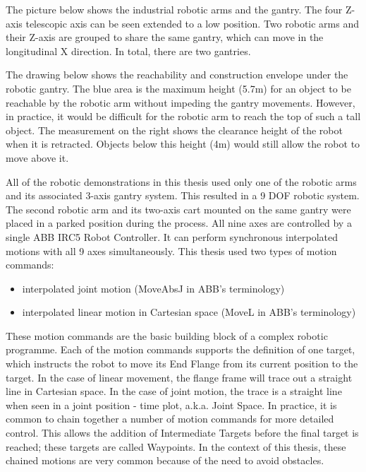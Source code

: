 The picture below shows the industrial robotic arms and the gantry. The four Z-axis telescopic axis can be seen extended to a low position. Two robotic arms and their Z-axis are grouped to share the same gantry, which can move in the longitudinal X direction. In total, there are two gantries.

The drawing below shows the reachability and construction envelope under the robotic gantry. The blue area is the maximum height (5.7m) for an object to be reachable by the robotic arm without impeding the gantry movements. However, in practice, it would be difficult for the robotic arm to reach the top of such a tall object. The measurement on the right shows the clearance height of the robot when it is retracted. Objects below this height (4m) would still allow the robot to move above it. 

All of the robotic demonstrations in this thesis used only one of the robotic arms and its associated 3-axis gantry system. This resulted in a 9 DOF robotic system. The second robotic arm and its two-axis cart mounted on the same gantry were placed in a parked position during the process.
All nine axes are controlled by a single ABB IRC5 Robot Controller. It can perform synchronous interpolated motions with all 9 axes simultaneously. This thesis used two types of motion commands: 

\begin{itemize}
    \item interpolated joint motion (MoveAbsJ in ABB’s terminology)
    \item interpolated linear motion in Cartesian space (MoveL in ABB’s terminology)
\end{itemize}

These motion commands are the basic building block of a complex robotic programme. Each of the motion commands supports the definition of one target, which instructs the robot to move its End Flange from its current position to the target. In the case of linear movement, the flange frame will trace out a straight line in Cartesian space. In the case of joint motion, the trace is a straight line when seen in a joint position - time plot, a.k.a. Joint Space.
In practice, it is common to chain together a number of motion commands for more detailed control. This allows the addition of Intermediate Targets before the final target is reached; these targets are called Waypoints. In the context of this thesis, these chained motions are very common because of the need to avoid obstacles.


